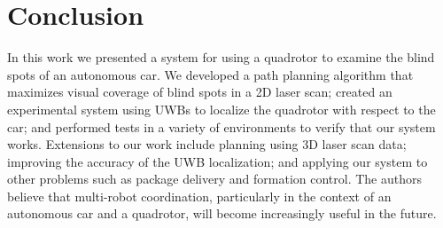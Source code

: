 
\section{Conclusion}

In this work we presented a system for using a quadrotor to examine the blind spots of an autonomous car. We developed a path planning algorithm that maximizes visual coverage of blind spots in a 2D laser scan; created an experimental system using UWBs to localize the quadrotor with respect to the car; and performed tests in a variety of environments to verify that our system works. Extensions to our work include planning using 3D laser scan data; improving the accuracy of the UWB localization; and applying our system to other problems such as package delivery and formation control. The authors believe that multi-robot coordination, particularly in the context of an autonomous car and a quadrotor, will become increasingly useful in the future.
